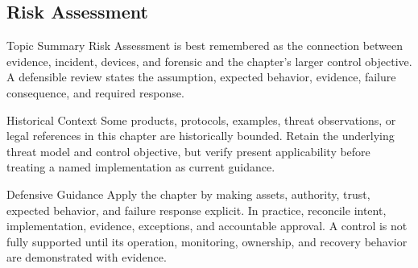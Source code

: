 \documentclass[11pt,letterpaper]{article}
\begin{document}
\subsection*{Risk Assessment}
\begin{CornellNotesTable}
\end{CornellNotesTable}
\begin{CornellSummaryBox}{Topic Summary}
Risk Assessment is best remembered as the connection between evidence, incident, devices, and forensic and the chapter's larger control objective. A defensible review states the assumption, expected behavior, evidence, failure consequence, and required response.
\end{CornellSummaryBox}
\begin{CornellWarningBox}{Historical Context}
Some products, protocols, examples, threat observations, or legal references in this chapter are historically bounded. Retain the underlying threat model and control objective, but verify present applicability before treating a named implementation as current guidance.
\end{CornellWarningBox}
\begin{CornellOverviewBox}{Defensive Guidance}
Apply the chapter by making assets, authority, trust, expected behavior, and failure response explicit. In practice, reconcile intent, implementation, evidence, exceptions, and accountable approval. A control is not fully supported until its operation, monitoring, ownership, and recovery behavior are demonstrated with evidence.
\end{CornellOverviewBox}
\end{document}
